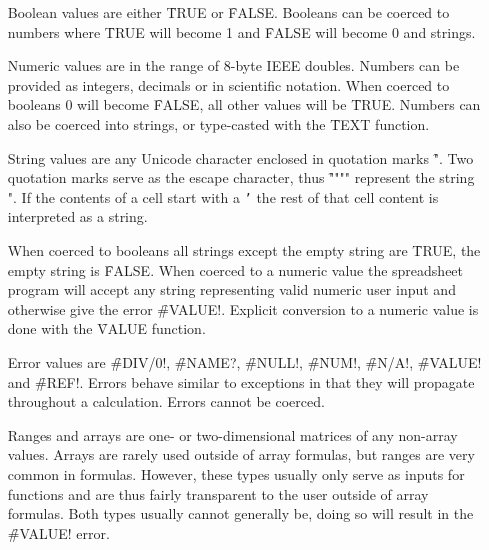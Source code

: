 \begin{itemize}
\item[Boolean] values are either \f{TRUE} or \f{FALSE}. Booleans can be coerced to numbers where \f{TRUE} will become 1 and \f{FALSE} will become 0 and strings.
\item[Numeric] values are in the range of 8-byte IEEE doubles. Numbers can be provided as integers, decimals or in scientific notation.
When coerced to booleans 0 will become \f{FALSE}, all other values will be \f{TRUE}. Numbers can also be coerced into strings, or type-casted with the \f{TEXT} function.

\item[String] values are any Unicode character enclosed in quotation marks \f{"}.
Two quotation marks serve as the escape character, thus \f{""""} represent the string ".
If the contents of a cell start with a \texttt{'} the rest of that cell content is interpreted as a string.

When coerced to booleans all strings except the empty string are \f{TRUE}, the empty string is \f{FALSE}.
When coerced to a numeric value the spreadsheet program will accept any string representing valid numeric user input and otherwise give the error \f{\#VALUE!}. Explicit conversion to a numeric value is done with the \f{VALUE} function.

\item[Error] values are \f{\#DIV/0!}, \f{\#NAME?}, \f{\#NULL!}, \f{\#NUM!}, \f{\#N/A!}, \f{\#VALUE!} and \f{\#REF!}.
Errors behave similar to exceptions in that they will propagate throughout a calculation. Errors cannot be coerced.

\item[Ranges and arrays] are one- or two-dimensional matrices of any non-array values. Arrays are rarely used outside of array formulas, but ranges are very common in formulas.
However, these types usually only serve as inputs for functions and are thus fairly transparent to the user outside of array formulas.
Both types usually cannot generally be, doing so will result in the \f{\#VALUE!} error.
\end{itemize}

